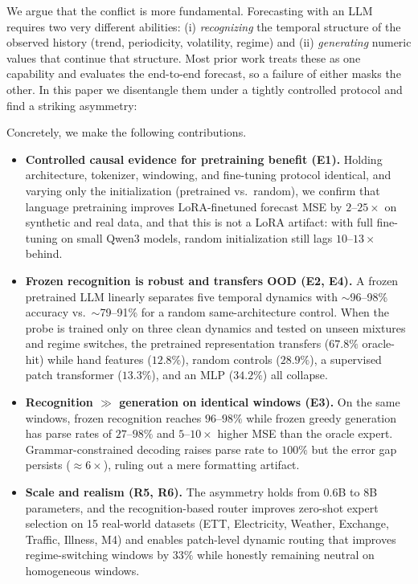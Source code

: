 \documentclass{article}
\begin{document}
We argue that the conflict is more fundamental.  Forecasting with an LLM
requires two very different abilities: (i) \emph{recognizing} the temporal
structure of the observed history (trend, periodicity, volatility, regime) and
(ii) \emph{generating} numeric values that continue that structure.  Most
prior work treats these as one capability and evaluates the end-to-end
forecast, so a failure of either masks the other.  In this paper we
disentangle them under a tightly controlled protocol and find a striking
asymmetry:

\begin{center}
\end{center}

Concretely, we make the following contributions.
\begin{itemize}
  \item \textbf{Controlled causal evidence for pretraining benefit (E1).}
  Holding architecture, tokenizer, windowing, and fine-tuning protocol
  identical, and varying only the initialization (pretrained vs.\ random), we
  confirm that language pretraining improves LoRA-finetuned forecast MSE by
  $2$--$25\times$ on synthetic and real data, and that this is not a LoRA
  artifact: with full fine-tuning on small Qwen3 models, random initialization
  still lags $10$--$13\times$ behind.
  \item \textbf{Frozen recognition is robust and transfers OOD (E2, E4).}
  A frozen pretrained LLM linearly separates five temporal dynamics with
  $\sim$96--98\% accuracy vs.\ $\sim$79--91\% for a random same-architecture
  control.  When the probe is trained only on three clean dynamics and tested
  on unseen mixtures and regime switches, the pretrained representation
  transfers ($67.8\%$ oracle-hit) while hand features ($12.8\%$), random
  controls ($28.9\%$), a supervised patch transformer ($13.3\%$), and an MLP
  ($34.2\%$) all collapse.
  \item \textbf{Recognition $\gg$ generation on identical windows (E3).}
  On the same windows, frozen recognition reaches $96$--$98\%$ while frozen
  greedy generation has parse rates of $27$--$98\%$ and $5$--$10\times$ higher
  MSE than the oracle expert.  Grammar-constrained decoding raises parse rate
  to $100\%$ but the error gap persists ($\approx 6\times$), ruling out a mere
  formatting artifact.
  \item \textbf{Scale and realism (R5, R6).}  The asymmetry holds from
  $0.6$B to $8$B parameters, and the recognition-based router improves
  zero-shot expert selection on 15 real-world datasets (ETT, Electricity,
  Weather, Exchange, Traffic, Illness, M4) and enables patch-level dynamic
  routing that improves regime-switching windows by $33\%$ while honestly
  remaining neutral on homogeneous windows.
\end{itemize}
\end{document}
